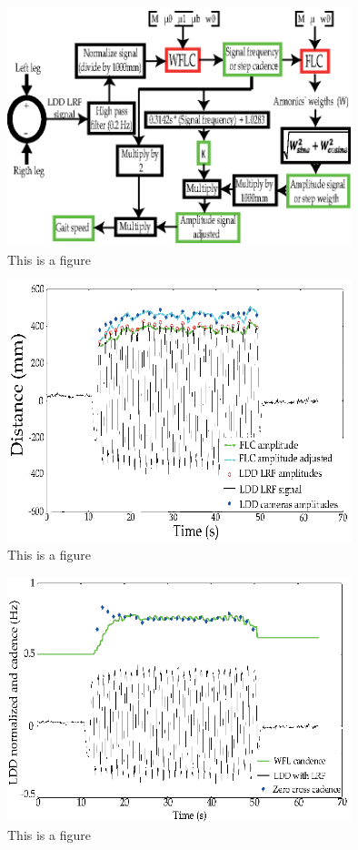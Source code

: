 \documentclass[journal,article,submit,moreauthors,pdftex,10pt,a4paper]{mdpi}
\theoremstyle{mdpi}
\newcounter{re}
\theoremstyle{mdpidefinition}
\begin{document}
\begin{figure}[H]
\centering
\includegraphics[width=10cm]{Diagram_Model.eps}
\caption{This is a figure}
\end{figure} 

\begin{figure}[H]
\centering
\includegraphics[width=10cm]{AmplitudeFLC_Adjusted.eps}
\caption{This is a figure}
\end{figure} 

\begin{figure}[H]
\centering
\includegraphics[width=10cm]{CadenceWFLC.eps}
\caption{This is a figure}
\end{figure} 
\end{document}
